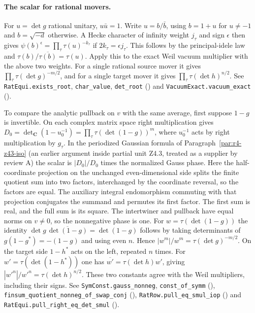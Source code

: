 \paragraph{The scalar for rational movers.}\label{r14:eq-rational}
For $u=\det g$ rational unitary, $u\bar u=1$. Write $u=b/\bar b$,
using $b=1+u$ for $u\ne-1$ and $b=\sqrt{-d}$ otherwise. A Hecke
character of infinity weight $j_\tau$ and sign $\epsilon$ then gives
$\psi(b)^{\epsilon}=\prod_\tau\tau(u)^{-k_\tau}$ if
$2k_\tau=\epsilon j_\tau$. This follows by the principal-idele law and
$\tau(b)/\overline{\tau(b)}=\tau(u)$. Apply this to the exact Weil
vacuum multiplier with the above two weights. For a single rational
source mover it gives $\prod_\tau\tau(\det g)^{-m/2}$, and for a
single target mover it gives $\prod_\tau\tau(\det h)^{n/2}$.
See \nolinkurl{RatEqui.exists_root}, \nolinkurl{char_value},
\nolinkurl{det_root} () and
\nolinkurl{VacuumExact.vacuum_exact} ().

To compare the analytic pullback on $v$ with the same average, first
suppose $1-g$ is invertible. On each complex matrix space right
multiplication gives
$D_0=\det_{\mathbf C}(1-u_0^{-1})=\prod_\tau\tau(\det(1-g))^m$,
where $u_0^{-1}$ acts by right multiplication by $g_\tau$.
In the periodized Gaussian formula of Paragraph~\ref{par:r4-z43-iso}
(an earlier argument inside partial unit Z4.3, treated as a supplier by
review A)
the scalar is $|D_0|/D_0$ times the normalized Gauss phase. Here the
half-coordinate projection on the unchanged even-dimensional side splits
the finite quotient sum into two factors, interchanged by the coordinate
reversal, so the factors are equal. The auxiliary integral endomorphism
commuting with that projection conjugates the summand and permutes its
first factor. The first sum is real, and the full sum is its square.
The intertwiner and pullback have equal norms on $v\ne0$, so the
nonnegative phase is one. For $w=\tau(\det(1-g))$ the identity
$\det g\,\overline{\det(1-g)}=\det(1-g)$ follows by taking
determinants of $g(1-g^*)=-(1-g)$ and using even $n$. Hence
$|w^m|/w^m=\tau(\det g)^{-m/2}$. On the target side $1-h^*$ acts
on the left, repeated $n$ times. For
$w'=\tau(\det(1-h^*))$ one has
$\overline{w'}=\tau(\det h)w'$, giving
$|w'^n|/w'^n=\tau(\det h)^{n/2}$.
These two constants agree with the Weil multipliers, including their
signs. See \nolinkurl{SymConst.gauss_nonneg}, \nolinkurl{const_of_symm}
(),
\nolinkurl{finsum_quotient_nonneg_of_swap_conj} (),
\nolinkurl{RatRow.pull_eq_smul_iop}
() and
\nolinkurl{RatEqui.pull_right_eq_det_smul}
().


